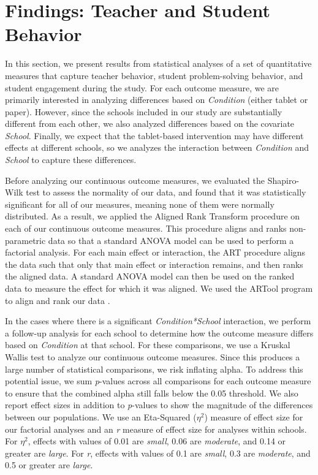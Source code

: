 \documentclass{sigchi}
\begin{document}
\section{Findings: Teacher and Student Behavior}
In this section, we present results from statistical analyses of a set of quantitative measures that capture teacher behavior, student problem-solving behavior, and student engagement during the study. For each outcome measure, we are primarily interested in analyzing differences based on \emph{Condition} (either tablet or paper). However, since the schools included in our study are substantially different from each other, we also analyzed differences based on the covariate \emph{School}. Finally, we expect that the tablet-based intervention may have different effects at different schools, so we analyzes the interaction between \emph{Condition} and \emph{School} to capture these differences.

Before analyzing our continuous outcome measures, we evaluated the Shapiro-Wilk test to assess the normality of our data, and found that it was statistically significant for all of our measures, meaning none of them were normally distributed. As a result, we applied the Aligned Rank Transform \cite{Higgins94, Salter93} procedure on each of our continuous outcome measures. This procedure aligns and ranks non-parametric data so that a standard ANOVA model can be used to perform a factorial analysis. For each main effect or interaction, the ART procedure aligns the data such that only that main effect or interaction remains, and then ranks the aligned data. A standard ANOVA model can then be used on the ranked data to measure the effect for which it was aligned. We used the ARTool program to align and rank our data \cite{Wobbrock11}.

In the cases where there is a significant \emph{Condition*School} interaction, we perform a follow-up analysis for each school to determine how the outcome measure differs based on \emph{Condition} at that school. For these comparisons, we use a Kruskal Wallis test to analyze our continuous outcome measures. Since this produces a large number of statistical comparisons, we risk inflating alpha. To address this potential issue, we sum \emph{p}-values across all comparisons for each outcome measure to ensure that the combined alpha still falls below the 0.05 threshold. We also report effect sizes in addition to \emph{p}-values to show the magnitude of the differences between our populations. We use an Eta-Squared ($\eta^2$) measure of effect size for our factorial analyses and an \emph{r} measure of effect size for analyses within schools. For $\eta^2$, effects with values of 0.01 are \emph{small}, 0.06 are \emph{moderate}, and 0.14 or greater are \emph{large}. For \emph{r}, effects with values of 0.1 are \emph{small}, 0.3 are \emph{moderate}, and 0.5 or greater are \emph{large}.
\end{document}
